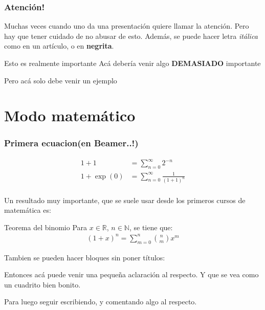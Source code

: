 \documentclass{beamer}
\begin{document}
\begin{frame}
\frametitle{Atenci\'on!}
Muchas veces cuando uno da una presentaci\'on quiere llamar la \alert{atenci\'on}. Pero hay que tener cuidado de no abusar de esto. Adem\'as, se puede hacer letra \textit{it\'alica} como en un art\'iculo, o en \textbf{negrita}.

\begin{alertblock}{Esto es realmente importante}
Ac\'a deber\'ia venir algo \textbf{DEMASIADO} importante
\end{alertblock}

\begin{examples}
Pero ac\'a solo debe venir un ejemplo
\end{examples}

\end{frame}




\section{Modo matem\'atico}
\begin{frame}
\frametitle{Primera ecuacion(en Beamer..!)}
\begin{align*}
1 + 1 &= \sum_{n=0}^{\infty}2^{-n}\\
1 + \exp(0) &= \sum_{n=0}^{\infty}\frac{1}{(1+1)^{n}}\\ 
\end{align*}
\end{frame}

\begin{frame}
Un resultado muy importante, que se suele usar desde los primeros cursos de matem\'atica es:
\begin{block}{Teorema del binomio}
Para $x \in \mathbb{R}$, $n \in \mathbb{N}$, se tiene que:
\begin{align}
(1+x)^n = \sum_{m=0}^{n}\binom{n}{m}x^m
\end{align}
\end{block}
\end{frame}

\begin{frame}
Tambien se pueden hacer bloques sin poner t\'itulos:
\begin{block}{}
	Entonces ac\'a puede venir una peque\~na aclaraci\'on al respecto. Y que se vea como un cuadrito bien bonito.
\end{block}
Para luego seguir escribiendo, y comentando algo al respecto.
\end{frame}
\end{document}
